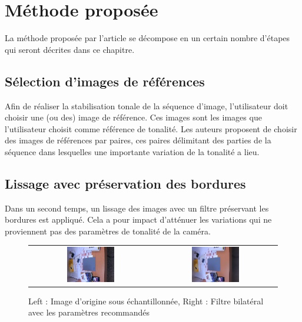 \section{Méthode proposée}
La méthode proposée par l'article \cite{farbman2011tonal} se décompose en un certain nombre d'étapes qui seront décrites dans ce chapitre.

\subsection{Sélection d'images de références}
Afin de réaliser la stabilisation tonale de la séquence d'image, l'utilisateur doit choisir une (ou des) image de référence. Ces images sont les images que l'utilisateur choisit comme référence de tonalité. 
Les auteurs proposent de choisir des images de références par paires, ces paires délimitant des parties de la séquence dans lesquelles une importante variation de la tonalité a lieu.
 
\subsection{Lissage avec préservation des bordures}
Dans un second temps, un lissage des images avec un filtre préservant les bordures est appliqué. Cela a pour impact d'atténuer les variations qui ne proviennent pas des paramètres de tonalité de la caméra. 

\begin{figure}[h]
\centering
\begin{tabular}{cc}
\includegraphics[width = 0.4\textwidth]{Chapters/Images/bilteral_filter1.png}&
\includegraphics[width = 0.4\textwidth]{Chapters/Images/bilteral_filter2.png}
\end{tabular}
\caption{Left : Image d'origine sous échantillonnée, Right : Filtre bilatéral avec les paramètres recommandés}
\end{figure}

